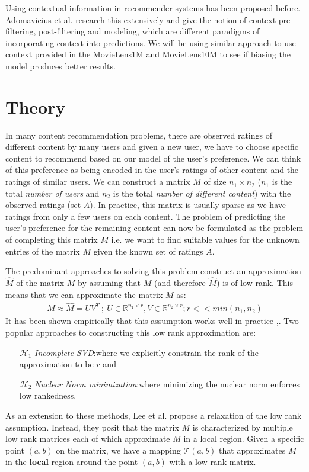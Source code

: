 \documentclass[10 pt,table]{article}  %
\begin{document}
Using contextual information in recommender systems has been proposed before. Adomavicius et al. \cite{adomavicius2005incorporating}\cite{adomavicius2011context} research this extensively and give the notion of context pre-filtering, post-filtering and modeling, which are different paradigms of incorporating context into predictions. We will be using similar approach to use context provided in the MovieLens1M and MovieLens10M to see if biasing the model produces better results.

\section{Theory}
In many content recommendation problems, there are observed ratings of different content by many users and given a new user, we have to choose specific content to recommend based on our model of the user's preference. We can think of this preference as being encoded in the user's ratings of other content and the ratings of similar users. We can construct a matrix $M$ of size $n_1 \times n_2$ ($n_1$ is the total \emph{number of users} and $n_2$ is the total \emph{number of different content}) with the observed ratings (set $A$). In practice, this matrix is usually sparse as we have ratings from only a few users on each content. The problem of predicting the user's preference for the remaining content can now be formulated as the problem of completing this matrix $M$ i.e. we want to find suitable values for the unknown entries of the matrix $M$ given the known set of ratings $A$. 

The predominant approaches to solving this problem construct an approximation $\hat{M}$ of the matrix $M$ by assuming that $M$ (and therefore $\hat{M}$) is of low rank. This means that we can approximate the matrix $M$ as:
\begin{align}
M \approx \hat{M} = UV^T \ ; \ U \in \mathbb{R}^{n_1 \times r}, V \in \mathbb{R}^{n_2 \times r}; r << min(n_1,n_2)
\end{align} 
It has been shown empirically that this assumption works well in practice \cite{paterek2007improving},\cite{koren2009matrix}. Two popular approaches to constructing this low rank approximation are:
\begin{itemize}
\item[$\mathcal{H}_1$] \emph{Incomplete SVD}:where we explicitly constrain the rank of the approximation to be $r$ and
\item[$\mathcal{H}_2$] \emph{Nuclear Norm minimization}:where minimizing the nuclear norm enforces low rankedness.
\end{itemize}
As an extension to these methods, Lee et al. \cite{lee2013local} propose a relaxation of the low rank assumption. Instead, they posit that the matrix $M$ is characterized by multiple low rank matrices each of which approximate $M$ in a local region. Given a specific point $(a,b)$ on the matrix, we have a mapping $\mathcal{T}(a,b)$ that approximates $M$ in the \textbf{local} region around the point $(a,b)$ with a low rank matrix. 
\end{document}
